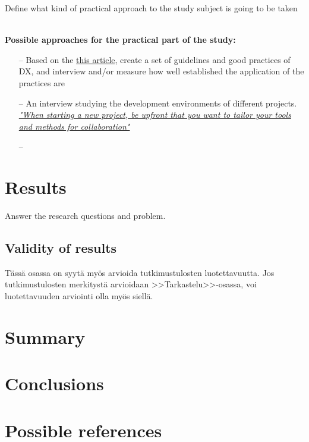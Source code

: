 \documentclass[english, 12pt, a4paper, sci, utf8, a-1b, online]{aaltothesis}
\begin{document}
Define what kind of practical approach to the study subject is going to be taken


\textbf{\\ Possible approaches for the practical part of the study:}

\newcommand{\uxdesigndx}{https://uxdesign.cc/contributing-great-developer-experience-designer-e1f497b0fb4}

\begin{itemize}
  \item [--] Based on the \href{\uxdesigndx}{this article}, create a set of guidelines and good practices of DX, and interview and/or measure how well established the application of the practices are
  \item [--] An interview studying the development environments of different projects. \href{\uxdesigndx}{\textit{"When starting a new project, be upfront that you want to tailor your tools and methods for collaboration"}}
  \item [--] 
\end{itemize}

\clearpage
\section{Results}

Answer the research questions and problem.

\subsection{Validity of results}

T\"ass\"a osassa on syyt\"a my\"os arvioida tutkimustulosten luotettavuutta.
Jos tutkimustulosten merkityst\"a arvioidaan >>Tarkastelu>>-osassa,
voi luotettavuuden arviointi olla my\"os siell\"a.

\clearpage
\section{Summary}

\clearpage
\section{Conclusions}

\clearpage
\section{Possible references}
\end{document}
